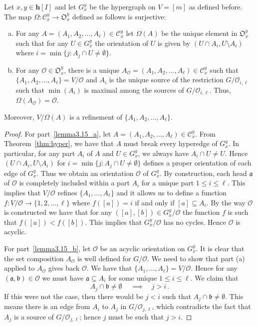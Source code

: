 \documentclass[ALCO,ThmDefs,Unicode,epreuves]{cedram}
\newcommand*{\alphenumi}{\renewcommand*{\theenumi}{\alph{enumi}}}
\begin{document}
\begin{lemma}\label{lem:Omega}
Let $x,y\in \mathbf{h}[I]$ and let $G_x^y$ be the hypergraph on $V=[m]$ as defined before. The map $\Omega\colon \mathcal{C}_{x}^{y} \to \mathfrak{O}_x^y$ defined as follows is surjective:
\begin{enumerate} [(a)]%
 \item %
\label{lemma3.15_a} For any $A=(A_1,A_2,\ldots, A_\ell)\in \mathcal{C}_{x}^{y}$ let $\Omega(A)$ be the unique element in $\mathfrak{O}_x^y$ such that for any $U\in G_x^y$ the orientation of $U$ is given by $(U\cap A_i,U\setminus A_i)$ where
 $i=\min\{j: A_j\cap U\ne \emptyset\}.$ 
 \item %
\label{lemma3.15_b} For any $\mathcal{O}\in \mathfrak{O}_x^y$, there is a unique $A_\mathcal{O}=(A_1,A_2,\ldots, A_\ell)\in \mathcal{C}_{x}^{y}$ such that $\{A_1,A_2,\ldots, A_\ell\}=V/\mathcal{O}$ and $A_i$ is the unique source of the restriction $G/\mathcal{O}_{i,\ell}$ such that $\min(A_i)$ is maximal among the sources of $G/\mathcal{O}_{i,\ell}$. Thus, $\Omega(A_{\mathcal{O}})=\mathcal{O}$.
\end{enumerate}
Moreover, $V/{\Omega(A)}$ is a refinement of $\{A_1,A_2,\ldots,A_\ell\}$.
\end{lemma}

\begin{proof}
 For part~\ref{lemma3.15_a}, let $A=(A_1,A_2,\ldots,A_\ell)\in \mathcal{C}_{x}^{y}$. From Theorem~\ref{thm:hyper}, we have that $A$ must break every hyperedge of $G_x^y$. In particular, for any part $A_i$ of $A$ and $U\in G_x^y$, we always have $A_i\cap U\ne U$.
 Hence $(U\cap A_i,U\setminus A_i)$ for $i=\min\{j: A_j\cap U\ne \emptyset\}$ defines a proper orientation of each edge of $G_x^y$. 
 Thus we obtain an orientation $\mathcal{O}$ of $G_x^y$. By construction, each head $\mathfrak{a}$ of $\mathcal{O}$ is completely included within a part $A_i$ for a unique part $1\le i\le \ell$. This implies that $V/\mathcal{O}$ refines $\{A_1,\ldots,A_\ell\}$ and it allows us to define a function $f\colon V/\mathcal{O}\to \{1,2,\ldots,\ell\}$ where $f([a])=i$ if and only if $[a]\subseteq A_i$.
 By the way $\mathcal{O}$ is constructed we have that for any $([a],[b])\in G_x^y/\mathcal{O}$ the function $f$ is such that $f([a])<f([b])$.
 This implies that $G_x^y/\mathcal{O}$ has no cycles. Hence $\mathcal{O}$ is acyclic.
 
 For part~\ref{lemma3.15_b}, let $\mathcal{O}$ be an acyclic orientation on $G_x^y$. It is clear that the set composition $A_{\mathcal{O}}$ is well defined for $G/\mathcal{O}$. We need to show that part (a) applied to $A_{\mathcal{O}}$ gives back $\mathcal{O}$. We have that $\{A_1,\ldots, A_\ell\}=V/\mathcal{O}$. Hence for any $(\mathfrak{a},\mathfrak{b})\in \mathcal{O}$ we must have $\mathfrak{a}\subseteq A_i$ for some unique $1\le i\le \ell$. 
 We claim that
 $$A_j\cap \mathfrak{b}\ne \emptyset\ \quad\implies \quad j>i\,.$$
 If this were not the case, then there would be $j<i$ such that $A_j\cap \mathfrak{b}\ne \emptyset$. This means there is an edge from $A_i$ to $A_j$ in $G/\mathcal{O}_{j,\ell}$, which contradicts the fact that $A_j$ is a source of $G/\mathcal{O}_{j,\ell}$; hence $j$ must be such that $j>i$.
\end{proof}
\end{document}
